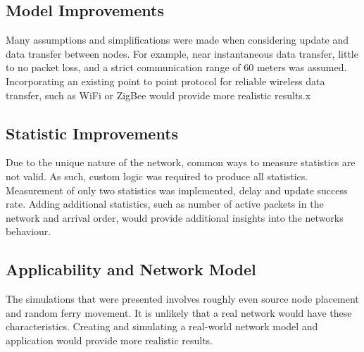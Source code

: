 \subsection{Model Improvements}

Many assumptions and simplifications were made when considering update and data transfer between nodes.
For example, near instantaneous data transfer, little to no packet loss, and a strict communication range of 60 meters was assumed.
Incorporating an existing point to point protocol for reliable wireless data transfer, such as WiFi or ZigBee would provide more realistic results.x

\subsection{Statistic Improvements}

Due to the unique nature of the network, common ways to measure statistics are not valid.
As such, custom logic was required to produce all statistics.
Measurement of only two statistics was implemented, delay and update success rate.
Adding additional statistics, such as number of active packets in the network and arrival order, would provide additional insights into the networks behaviour.

\subsection{Applicability and Network Model}

The simulations that were presented involves roughly even source node placement and random ferry movement.
It is unlikely that a real network would have these characteristics.
Creating and simulating a real-world network model and application would provide more realistic results.
